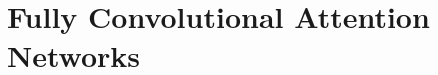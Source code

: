 \documentclass[10pt,twocolumn,letterpaper]{article}
\begin{document}





\section{Fully Convolutional Attention Networks}

\end{document}
